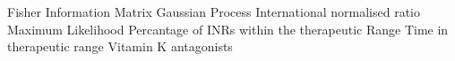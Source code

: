 \begin{acronym}
	 {Fisher Information Matrix}
	 {Gaussian Process}
	 {International normalised ratio}
	 {Maximum Likelihood}
	 {Percantage of INRs within the therapeutic Range}
	 {Time in therapeutic range}
	 {Vitamin K antagonists}
\end{acronym}


